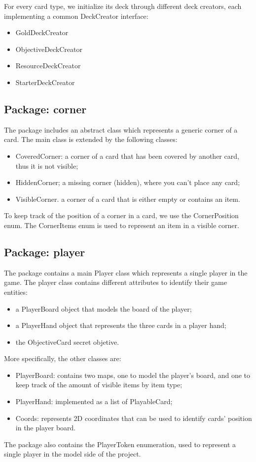 \documentclass{article}
\begin{document}
\noindent For every card type, we initialize its deck through different deck creators, each implementing a common DeckCreator interface:
\begin{itemize}
    \item GoldDeckCreator
    \item ObjectiveDeckCreator
    \item ResourceDeckCreator
    \item StarterDeckCreator
\end{itemize}

\subsection{Package: corner}
The package includes an abstract  class which represents a generic corner of a card. 
The main class is extended by the following classes:
\begin{itemize}
    \item CoveredCorner: a corner of a card that has been covered by another card, thus it is not visible;
    \item HiddenCorner; a missing corner (hidden), where you can't place any card;
    \item VisibleCorner. a corner of a card that is either empty or contains an item.
\end{itemize}
To keep track of the position of a corner in a card, we use the CornerPosition enum.
\noindent
The CornerItems enum is used to represent an item in a visible corner.

\subsection{Package: player}
The package contains a main Player class which represents a single player in the game.
The player class contains different attributes to identify their game entities:
\begin{itemize}
    \item a PlayerBoard object that models the board of the player;
    \item a PlayerHand object that represents the three cards in a player hand;
    \item the ObjectiveCard secret objetive. 
\end{itemize}

\noindent
More specifically, the other classes are:
\begin{itemize}
    \item PlayerBoard: contains two maps, one to model the player's board, and one to keep track of the amount of visible items by item type;
    \item PlayerHand: implemented as a list of PlayableCard;
    \item Coords: represents 2D coordinates that can be used to identify cards' position in the player board.
\end{itemize}
\noindent
The package also contains the PlayerToken enumeration, used to represent a single player in the model side of the project.
\end{document}
